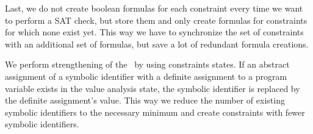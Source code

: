 
Last, we do not create boolean formulas for each constraint every time we want to perform a SAT check, but store them and only create formulas for constraints for which none exist yet.
This way we have to synchronize the set of constraints with an additional set of formulas, but save a lot of redundant formula creations.

We perform strengthening of the \ by using constraints states.
If an abstract assignment of a symbolic identifier with a definite assignment to a program variable exists in the value analysis state, the symbolic identifier is replaced by the definite assignment's value. This way we reduce the number of existing symbolic identifiers to the necessary minimum and create constraints with fewer symbolic identifiers.
